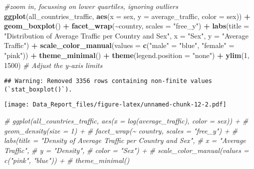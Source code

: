 \documentclass[
]{article}
\newenvironment{Shaded}{\begin{snugshade}}{\end{snugshade}}
\newcommand{\AttributeTok}[1]{\textcolor[rgb]{0.13,0.29,0.53}{#1}}
\newcommand{\CommentTok}[1]{\textcolor[rgb]{0.56,0.35,0.01}{\textit{#1}}}
\newcommand{\DecValTok}[1]{\textcolor[rgb]{0.00,0.00,0.81}{#1}}
\newcommand{\FunctionTok}[1]{\textcolor[rgb]{0.13,0.29,0.53}{\textbf{#1}}}
\newcommand{\NormalTok}[1]{#1}
\newcommand{\OtherTok}[1]{\textcolor[rgb]{0.56,0.35,0.01}{#1}}
\newcommand{\SpecialCharTok}[1]{\textcolor[rgb]{0.81,0.36,0.00}{\textbf{#1}}}
\newcommand{\StringTok}[1]{\textcolor[rgb]{0.31,0.60,0.02}{#1}}
\begin{document}
\begin{Shaded}
\begin{Highlighting}[]
\CommentTok{\#zoom in, focussing on lower quartiles, ignoring outliers}
\FunctionTok{ggplot}\NormalTok{(all\_countries\_traffic, }\FunctionTok{aes}\NormalTok{(}\AttributeTok{x =}\NormalTok{ sex, }\AttributeTok{y =}\NormalTok{ average\_traffic, }\AttributeTok{color =}\NormalTok{ sex)) }\SpecialCharTok{+}
  \FunctionTok{geom\_boxplot}\NormalTok{() }\SpecialCharTok{+}
  \FunctionTok{facet\_wrap}\NormalTok{(}\SpecialCharTok{\textasciitilde{}}\NormalTok{country, }\AttributeTok{scales =} \StringTok{"free\_y"}\NormalTok{) }\SpecialCharTok{+}
  \FunctionTok{labs}\NormalTok{(}\AttributeTok{title =} \StringTok{"Distribution of Average Traffic per Country and Sex"}\NormalTok{,}
       \AttributeTok{x =} \StringTok{"Sex"}\NormalTok{,}
       \AttributeTok{y =} \StringTok{"Average Traffic"}\NormalTok{) }\SpecialCharTok{+}
  \FunctionTok{scale\_color\_manual}\NormalTok{(}\AttributeTok{values =} \FunctionTok{c}\NormalTok{(}\StringTok{"male"} \OtherTok{=} \StringTok{"blue"}\NormalTok{, }\StringTok{"female"} \OtherTok{=} \StringTok{"pink"}\NormalTok{)) }\SpecialCharTok{+}
  \FunctionTok{theme\_minimal}\NormalTok{() }\SpecialCharTok{+}
  \FunctionTok{theme}\NormalTok{(}\AttributeTok{legend.position =} \StringTok{"none"}\NormalTok{) }\SpecialCharTok{+}
  \FunctionTok{ylim}\NormalTok{(}\DecValTok{1}\NormalTok{, }\DecValTok{1500}\NormalTok{)  }\CommentTok{\# Adjust the y{-}axis limits}
\end{Highlighting}
\end{Shaded}

\begin{verbatim}
## Warning: Removed 3356 rows containing non-finite values (`stat_boxplot()`).
\end{verbatim}

\texttt{[image: Data\_Report\_files/figure-latex/unnamed-chunk-12-2.pdf]}

\begin{Shaded}
\begin{Highlighting}[]
\CommentTok{\# ggplot(all\_countries\_traffic, aes(x = log(average\_traffic), color = sex)) +}
\CommentTok{\#   geom\_density(size = 1) +}
\CommentTok{\#   facet\_wrap(\textasciitilde{} country, scales = "free\_y") +}
\CommentTok{\#   labs(title = "Density of Average Traffic per Country and Sex",}
\CommentTok{\#        x = "Average Traffic",}
\CommentTok{\#        y = "Density",}
\CommentTok{\#        color = "Sex") +}
\CommentTok{\#   scale\_color\_manual(values = c("pink", "blue")) +}
\CommentTok{\#   theme\_minimal()}
\end{Highlighting}
\end{Shaded}
\end{document}
